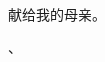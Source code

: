 \documentclass{ctexbook}
\title{\sffamily {\Huge B类业余无线电台操作技术能力考试攻略本}} %
\author{\Large \texttt{BG7XTQ} (原\texttt{JJ1DSB}) 编著} %
\date{\sffamily {\Large \today} }  %
\begin{document}

\maketitle%

\thispagestyle{empty}
\vfil
\ \\
\vspace{15em}
\begin{center}
	{\Large 献给我的母亲。}
\end{center}、

\newpage

\tableofcontents%








%
\end{document}
